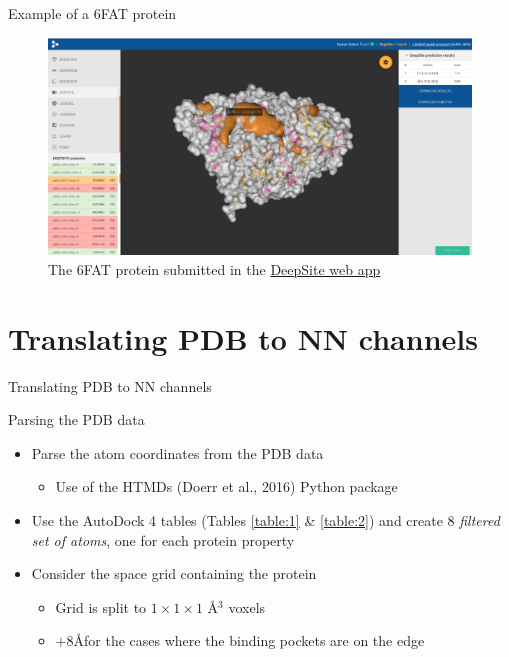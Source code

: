 \documentclass{beamer}
\begin{document}
\begin{frame}{Example of a 6FAT protein}
  \begin{figure}[h]
    \includegraphics[width=1\textwidth]{deepsite_6fat_result}
    \caption{The 6FAT protein submitted in the \href{https://www.playmolecule.com/deepsite/}{DeepSite web app}}
  \end{figure}
\end{frame}

\section{Translating PDB to NN channels}

\begin{frame}{Translating PDB to NN channels}
  \begin{block}{Parsing the PDB data}
    \begin{itemize}
      \item Parse the atom coordinates from the PDB data
      \begin{itemize}
        \item Use of the HTMDs (Doerr et al., 2016) Python package
      \end{itemize}
      \item Use the AutoDock 4 tables (Tables \ref{table:1} \& \ref{table:2}) and create 8 \emph{filtered set of atoms}, one for each protein property
      \item Consider the space grid containing the protein
      \begin{itemize}
        \item Grid is split to $1 \times 1 \times 1 $ \AA$^3$ voxels
        \item $+8$\AA \;for the cases where the binding pockets are on the edge
      \end{itemize}
    \end{itemize}
  \end{block}
\end{frame}
\end{document}
